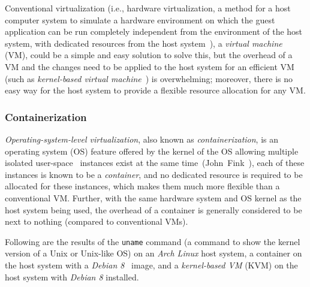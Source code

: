 \medskip

Conventional virtualization (i.e., hardware virtualization, a method for a
host computer system to simulate a hardware environment on which the guest
application can be run completely independent from the environment of the host
system, with dedicated resources from the host system~\citep[Chap.~16]{os}),
a \emph{virtual machine} (VM), could be a simple and easy solution to solve
this, but the overhead of a VM and the changes need to be applied to the host
system for an efficient VM (such as 
\emph{kernel-based virtual machine}~\cite{kvm}) is overwhelming;
moreover, there is no easy way for the host system to provide a flexible
resource allocation for any VM.

\subsubsection{Containerization}
\emph{Operating-system-level virtualization}, also known as
\emph{containerization}, is an operating system (OS) feature offered by the
kernel of the OS allowing multiple isolated user-space~\citep[Sec.~1.5.1]{os}
instances exist at the same time~(John~Fink~\cite{docker}),
each of these instances is known to be a \emph{container}, and no dedicated resource
is required to be allocated for these instances, which makes them much more
flexible than a conventional VM. Further, with the same hardware system and
OS kernel as the host system being used, the overhead of a container is
generally considered to be next to nothing (compared to conventional VMs).

\pagebreak

Following are the results of the \texttt{uname} command
(a command to show the kernel version of a Unix or Unix-like OS)
on an \emph{Arch Linux} host system, a container on the host system
with a \emph{Debian 8}~\cite{debian} image, and a \emph{kernel-based VM} (KVM)
on the host system with \emph{Debian 8} installed.

\begin{centering}



\end{centering}

